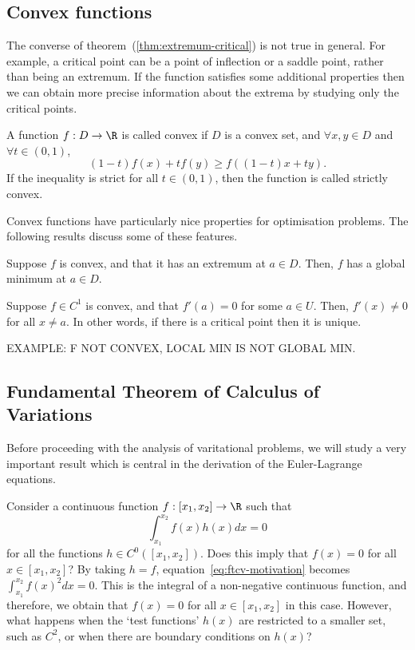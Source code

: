 \subsection{Convex functions}
The converse of theorem~(\ref{thm:extremum-critical}) is not true in general. For example, a critical point can be a point of inflection or a saddle point, rather than being an extremum. If the function satisfies some additional properties then we can obtain more precise information about the extrema by studying only the critical points.
\begin{ndfn}
  A function $f:D \to \R$ is called convex if $D$ is a convex set, and $\forall x, y \in D$ and $\forall t \in (0,1)$,
  \begin{equation}
    (1-t) f(x) + t f(y) \geq f\left((1-t)x + ty\right).
  \end{equation}
  If the inequality is strict for all $t \in (0,1)$, then the function is called strictly convex.
\end{ndfn}
Convex functions have particularly nice properties for optimisation problems. The following results discuss some of these features.
\begin{nprop}
  Suppose $f$ is convex, and that it has an extremum at $a \in D$. Then, $f$ has a global minimum at $a \in D$.
\end{nprop}
\begin{nprop}
  Suppose $f \in C^{1}$ is convex, and that $f'(a)=0$ for some $a \in U$. Then, $f'(x) \neq 0$ for all $x \neq a$. In other words, if there is a critical point then it is unique.
\end{nprop}

EXAMPLE: F NOT CONVEX, LOCAL MIN IS NOT GLOBAL MIN.


\subsection{Fundamental Theorem of Calculus of Variations}
Before proceeding with the analysis of varitational problems, we will study a very important result which is central in the derivation of the Euler-Lagrange equations.

Consider a continuous function $f : [x_1, x_2] \to \R$ such that
\begin{equation}
  \label{eq:ftcv-motivation}
  \int_{x_1}^{x_2} f(x) h(x) dx = 0
\end{equation}
for all the functions $h \in C^{0}([x_1, x_2])$. Does this imply that $f(x)=0$ for all $x \in [x_1, x_2]$? By taking $h = f$, equation~\eqref{eq:ftcv-motivation} becomes $\int_{x_1}^{x_2} f(x)^2 dx = 0$. This is the integral of a non-negative continuous function, and therefore, we obtain that $f(x)=0$ for all $x \in [x_1, x_2]$ in this case. However, what happens when the `test functions' $h(x)$ are restricted to a smaller set, such as $C^{2}$, or when there are boundary conditions on $h(x)$?

